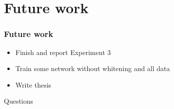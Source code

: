 \documentclass{beamer}
\begin{document}
	
	\section[Future work]{Future work}
	\begin{frame}
		\frametitle{Future work}
		\begin{itemize}
			\item Finish and report Experiment 3
			\item Train some network without whitening and all data
			\item Write thesis
		\end{itemize}
	\end{frame}

	\begin{frame}[c]
		\begin{center}
		\Huge Questions
		\end{center}
	\end{frame}
\end{document}
